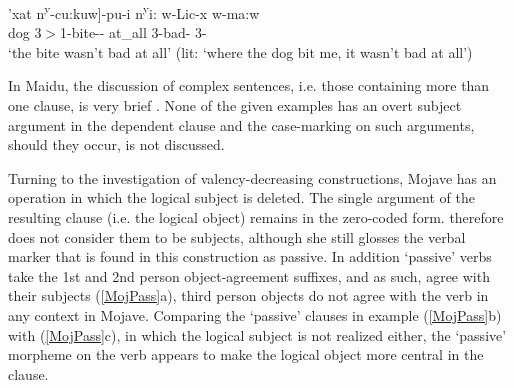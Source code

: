 \begin{exe}\ex\label{DieDep}
\gll  {\rm[}'xat n\textsuperscript{y}-cu:kuw{\rm]}-pu-i n\textsuperscript{y}i: w-Lic-x w-ma:w\\
dog 3$>$1-bite-\dem{}-\loc{} at\_all 3-bad-\irr{} 3-\Neg{}\\
\glt `the bite wasn't bad at all' (lit: `where the dog bit me, it wasn't bad at all') \end{exe}

In Maidu, the discussion of complex sentences, i.e. those containing more than one clause, is very brief \citep[69--70]{Shipley:1964}. 
None of the given examples has an overt subject argument in the dependent clause and the case-marking on such arguments, should they occur, is not discussed.  






Turning to the investigation of valency-decreasing constructions, Mojave has an operation in which the logical subject is deleted.  
The single argument of the resulting clause (i.e. the logical object) remains in the zero-coded form. 
\citet{Munro:1976} therefore does not consider them to be subjects, although she still glosses the verbal marker that is found in this construction as passive. 
In addition `passive' verbs take the 1st and 2nd person object-agreement suffixes, and as such, agree with their subjects (\ref{MojPass}a), third person objects do not agree with the verb in any context in Mojave.
Comparing the `passive' clauses in example (\ref{MojPass}b) with (\ref{MojPass}c), in which the logical subject is not realized either, the `passive' morpheme on the verb appears to  make the logical object more central in the clause.

